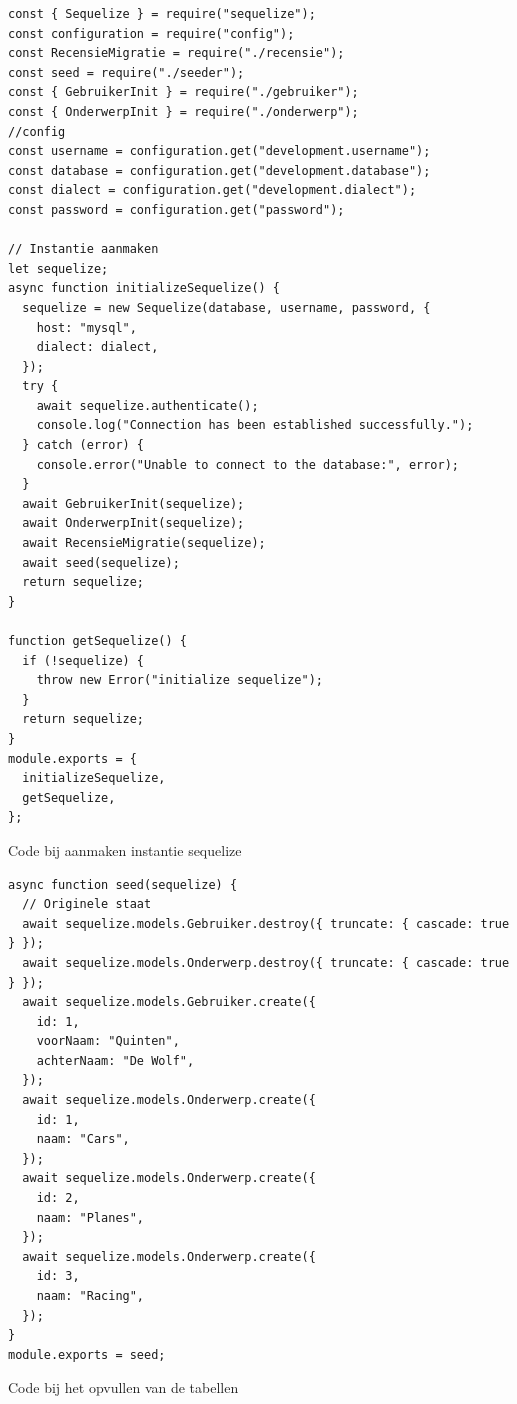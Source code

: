 \begin{listing}[H]
  \centering
  \begin{verbatim}
const { Sequelize } = require("sequelize");
const configuration = require("config");
const RecensieMigratie = require("./recensie");
const seed = require("./seeder");
const { GebruikerInit } = require("./gebruiker");
const { OnderwerpInit } = require("./onderwerp");
//config
const username = configuration.get("development.username");
const database = configuration.get("development.database");
const dialect = configuration.get("development.dialect");
const password = configuration.get("password");

// Instantie aanmaken
let sequelize;
async function initializeSequelize() {
  sequelize = new Sequelize(database, username, password, {
    host: "mysql",
    dialect: dialect,
  });
  try {
    await sequelize.authenticate();
    console.log("Connection has been established successfully.");
  } catch (error) {
    console.error("Unable to connect to the database:", error);
  }
  await GebruikerInit(sequelize);
  await OnderwerpInit(sequelize);
  await RecensieMigratie(sequelize);
  await seed(sequelize);
  return sequelize;
}

function getSequelize() {
  if (!sequelize) {
    throw new Error("initialize sequelize");
  }
  return sequelize;
}
module.exports = {
  initializeSequelize,
  getSequelize,
};
\end{verbatim}
\caption{\label{code:Instantie}Code bij aanmaken instantie sequelize}
\end{listing}

\begin{listing}[H]
  \centering
  \begin{verbatim}
async function seed(sequelize) {
  // Originele staat
  await sequelize.models.Gebruiker.destroy({ truncate: { cascade: true } });
  await sequelize.models.Onderwerp.destroy({ truncate: { cascade: true } });
  await sequelize.models.Gebruiker.create({
    id: 1,
    voorNaam: "Quinten",
    achterNaam: "De Wolf",
  });
  await sequelize.models.Onderwerp.create({
    id: 1,
    naam: "Cars",
  });
  await sequelize.models.Onderwerp.create({
    id: 2,
    naam: "Planes",
  });
  await sequelize.models.Onderwerp.create({
    id: 3,
    naam: "Racing",
  });
}
module.exports = seed;
\end{verbatim}
\caption{\label{code:Seed}Code bij het opvullen van de tabellen}
\end{listing}

